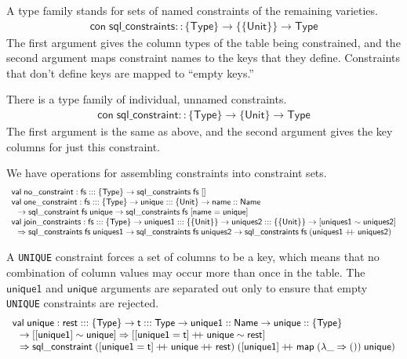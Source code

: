 \documentclass{article}
\newcommand{\mt}[1]{\mathsf{#1}}
\newcommand{\rc}{+ \hspace{-.075in} + \;}
\begin{document}
A type family stands for sets of named constraints of the remaining varieties.
$$\begin{array}{l}
  \mt{con} \; \mt{sql\_constraints} :: \{\mt{Type}\} \to \{\{\mt{Unit}\}\} \to \mt{Type}
\end{array}$$
The first argument gives the column types of the table being constrained, and the second argument maps constraint names to the keys that they define.  Constraints that don't define keys are mapped to ``empty keys.''

There is a type family of individual, unnamed constraints.
$$\begin{array}{l}
  \mt{con} \; \mt{sql\_constraint} :: \{\mt{Type}\} \to \{\mt{Unit}\} \to \mt{Type}
\end{array}$$
The first argument is the same as above, and the second argument gives the key columns for just this constraint.

We have operations for assembling constraints into constraint sets.
$$\begin{array}{l}
  \mt{val} \; \mt{no\_constraint} : \mt{fs} ::: \{\mt{Type}\} \to \mt{sql\_constraints} \; \mt{fs} \; [] \\
  \mt{val} \; \mt{one\_constraint} : \mt{fs} ::: \{\mt{Type}\} \to \mt{unique} ::: \{\mt{Unit}\} \to \mt{name} :: \mt{Name} \\
  \hspace{.1in} \to \mt{sql\_constraint} \; \mt{fs} \; \mt{unique} \to \mt{sql\_constraints} \; \mt{fs} \; [\mt{name} = \mt{unique}] \\
  \mt{val} \; \mt{join\_constraints} : \mt{fs} ::: \{\mt{Type}\} \to \mt{uniques1} ::: \{\{\mt{Unit}\}\} \to \mt{uniques2} ::: \{\{\mt{Unit}\}\} \to [\mt{uniques1} \sim \mt{uniques2}] \\
  \hspace{.1in} \Rightarrow \mt{sql\_constraints} \; \mt{fs} \; \mt{uniques1} \to \mt{sql\_constraints} \; \mt{fs} \; \mt{uniques2} \to \mt{sql\_constraints} \; \mt{fs} \; (\mt{uniques1} \rc \mt{uniques2})
\end{array}$$

A \texttt{UNIQUE} constraint forces a set of columns to be a key, which means that no combination of column values may occur more than once in the table.  The $\mt{unique1}$ and $\mt{unique}$ arguments are separated out only to ensure that empty \texttt{UNIQUE} constraints are rejected.
$$\begin{array}{l}
  \mt{val} \; \mt{unique} : \mt{rest} ::: \{\mt{Type}\} \to \mt{t} ::: \mt{Type} \to \mt{unique1} :: \mt{Name} \to \mt{unique} :: \{\mt{Type}\} \\
  \hspace{.1in} \to [[\mt{unique1}] \sim \mt{unique}] \Rightarrow [[\mt{unique1} = \mt{t}] \rc \mt{unique} \sim \mt{rest}] \\
  \hspace{.1in} \Rightarrow \mt{sql\_constraint} \; ([\mt{unique1} = \mt{t}] \rc \mt{unique} \rc \mt{rest}) \; ([\mt{unique1}] \rc \mt{map} \; (\lambda \_ \Rightarrow ()) \; \mt{unique})
\end{array}$$
\end{document}
